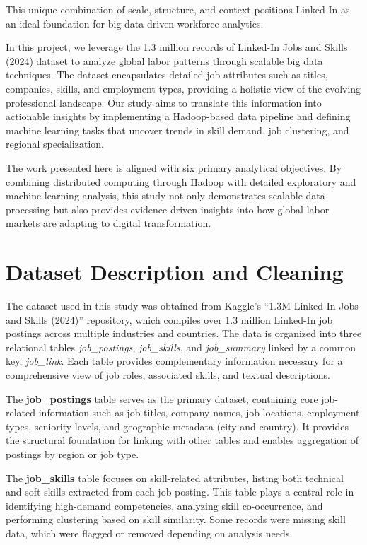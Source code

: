 \documentclass[conference]{IEEEtran}
\begin{document}
This unique combination of scale, structure, and context positions Linked-In as an ideal foundation for big data driven workforce analytics.

In this project, we leverage the 1.3 million records of Linked-In Jobs and Skills (2024) dataset to analyze global labor patterns through scalable big data techniques. The dataset encapsulates detailed job attributes such as titles, companies, skills, and employment types, providing a holistic view of the evolving professional landscape. Our study aims to translate this information into actionable insights by implementing a Hadoop-based data pipeline and defining machine learning tasks that uncover trends in skill demand, job clustering, and regional specialization.

The work presented here is aligned with six primary analytical objectives. By combining distributed computing through Hadoop with detailed exploratory and machine learning analysis, this study not only demonstrates scalable data processing but also provides evidence-driven insights into how global labor markets are adapting to digital transformation.


\section{Dataset Description and Cleaning}
The dataset used in this study was obtained from Kaggle’s “1.3M Linked-In Jobs and Skills (2024)” repository, which compiles over 1.3 million Linked-In job postings across multiple industries and countries. The data is organized into three relational tables \textit{job\_postings}, \textit{job\_skills}, and \textit{job\_summary} linked by a common key, \textit{job\_link}. Each table provides complementary information necessary for a comprehensive view of job roles, associated skills, and textual descriptions.

The \textbf{job\_postings} table serves as the primary dataset, containing core job-related information such as job titles, company names, job locations, employment types, seniority levels, and geographic metadata (city and country). It provides the structural foundation for linking with other tables and enables aggregation of postings by region or job type.

The \textbf{job\_skills} table focuses on skill-related attributes, listing both technical and soft skills extracted from each job posting. This table plays a central role in identifying high-demand competencies, analyzing skill co-occurrence, and performing clustering based on skill similarity. Some records were missing skill data, which were flagged or removed depending on analysis needs.
\end{document}

